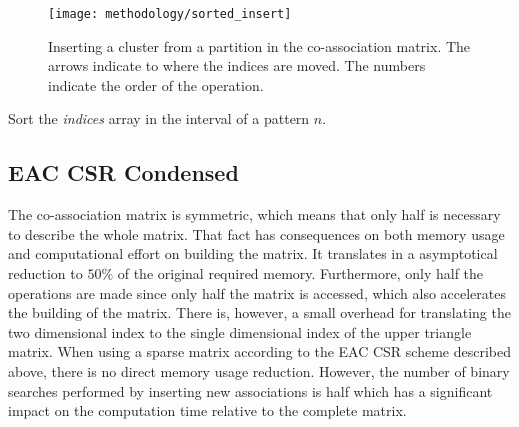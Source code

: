 \begin{figure}[hbtp]
\centering
\texttt{[image: methodology/sorted\_insert]}
\caption{Inserting a cluster from a partition in the co-association matrix. The arrows indicate to where the indices are moved. The numbers indicate the order of the operation.}
\label{fig:normal part}
\end{figure}

\begin{algorithm}
\caption{Sort the \emph{indices} array in the interval of a pattern $n$.}\label{alg:eac csr sort cluster}
\begin{algorithmic}[1]

    \EndWhile
\EndWhile

\EndProcedure
\end{algorithmic}
\end{algorithm}

\subsection{EAC CSR Condensed}

The co-association matrix is symmetric, which means that only half is necessary to describe the whole matrix.
That fact has consequences on both memory usage and computational effort on building the matrix.
It translates in a asymptotical reduction to $50\%$ of the original required memory.
Furthermore, only half the operations are made since only half the matrix is accessed, which also accelerates the building of the matrix.
There is, however, a small overhead for translating the two dimensional index to the single dimensional index of the upper triangle matrix.
When using a sparse matrix according to the EAC CSR scheme described above, there is no direct memory usage reduction.
However, the number of binary searches performed by inserting new associations is half which has a significant impact on the computation time relative to the complete matrix.

